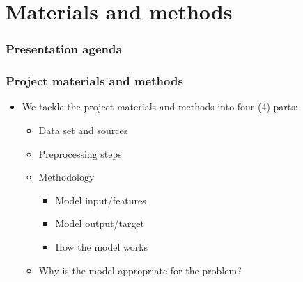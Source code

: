 \section{Materials and methods}
\begin{frame}
\frametitle{Presentation agenda}
\tableofcontents[currentsection]
\end{frame}

\begin{frame}
\frametitle{Project materials and methods}
	\begin{itemize}
		\item We tackle the project materials and methods into four (4) parts:
			\begin{itemize}
				\item Data set and sources
				\item Preprocessing steps
				\item Methodology
				\begin{itemize}
				  \item Model input/features
				  \item Model output/target
				  \item How the model works
				\end{itemize}
				\item Why is the model appropriate for the problem?
			\end{itemize}
	\end{itemize}
\end{frame}





